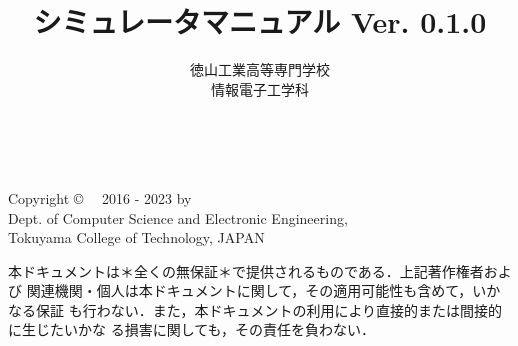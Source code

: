 \documentclass[a4paper,11pt,twocolumn,openany]{ltjsbook}
\newcommand{\ver}{Ver. 0.1.0}
\begin{document}
\title{\tac シミュレータマニュアル \ver}
\author{徳山工業高等専門学校\\情報電子工学科}
\date{}
\maketitle

\thispagestyle{empty}
\onecolumn
~
\vfill
\begin{flushleft}
Copyright \copyright ~~ 2016 - 2023 by \\
Dept. of Computer Science and Electronic Engineering, \\
Tokuyama College of Technology, JAPAN
\end{flushleft}

\vspace{0.8cm}

本ドキュメントは＊全くの無保証＊で提供されるものである．上記著作権者および
関連機関・個人は本ドキュメントに関して，その適用可能性も含めて，いかなる保証
も行わない．また，本ドキュメントの利用により直接的または間接的に生じたいかな
る損害に関しても，その責任を負わない．

\setcounter{tocdepth}{1}
\tableofcontents





\appendix



\vfill
\end{document}
